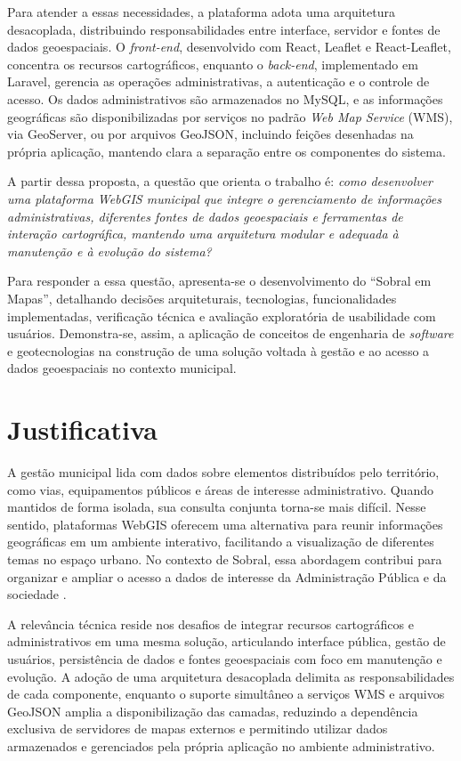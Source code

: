 Para atender a essas necessidades, a plataforma adota uma arquitetura desacoplada, distribuindo responsabilidades entre interface, servidor e fontes de dados geoespaciais. O \textit{front-end}, desenvolvido com React, Leaflet e React-Leaflet, concentra os recursos cartográficos, enquanto o \textit{back-end}, implementado em Laravel, gerencia as operações administrativas, a autenticação e o controle de acesso. Os dados administrativos são armazenados no MySQL, e as informações geográficas são disponibilizadas por serviços no padrão \textit{Web Map Service} (WMS), via GeoServer, ou por arquivos GeoJSON, incluindo feições desenhadas na própria aplicação, mantendo clara a separação entre os componentes do sistema.

A partir dessa proposta, a questão que orienta o trabalho é: \textit{como desenvolver uma plataforma \gls{WebGIS} municipal que integre o gerenciamento de informações administrativas, diferentes fontes de dados geoespaciais e ferramentas de interação cartográfica, mantendo uma arquitetura modular e adequada à manutenção e à evolução do sistema?}

Para responder a essa questão, apresenta-se o desenvolvimento do ``Sobral em Mapas'', detalhando decisões arquiteturais, tecnologias, funcionalidades implementadas, verificação técnica e avaliação exploratória de usabilidade com usuários. Demonstra-se, assim, a aplicação de conceitos de engenharia de \textit{software} e geotecnologias na construção de uma solução voltada à gestão e ao acesso a dados geoespaciais no contexto municipal.

\section{Justificativa}

A gestão municipal lida com dados sobre elementos distribuídos pelo território, como vias, equipamentos públicos e áreas de interesse administrativo. Quando mantidos de forma isolada, sua consulta conjunta torna-se mais difícil. Nesse sentido, plataformas \gls{WebGIS} oferecem uma alternativa para reunir informações geográficas em um ambiente interativo, facilitando a visualização de diferentes temas no espaço urbano. No contexto de Sobral, essa abordagem contribui para organizar e ampliar o acesso a dados de interesse da Administração Pública e da sociedade \cite{Marotta2020,Alcantara2015}.

A relevância técnica reside nos desafios de integrar recursos cartográficos e administrativos em uma mesma solução, articulando interface pública, gestão de usuários, persistência de dados e fontes geoespaciais com foco em manutenção e evolução. A adoção de uma arquitetura desacoplada delimita as responsabilidades de cada componente, enquanto o suporte simultâneo a serviços \gls{WMS} e arquivos GeoJSON amplia a disponibilização das camadas, reduzindo a dependência exclusiva de servidores de mapas externos e permitindo utilizar dados armazenados e gerenciados pela própria aplicação no ambiente administrativo.

